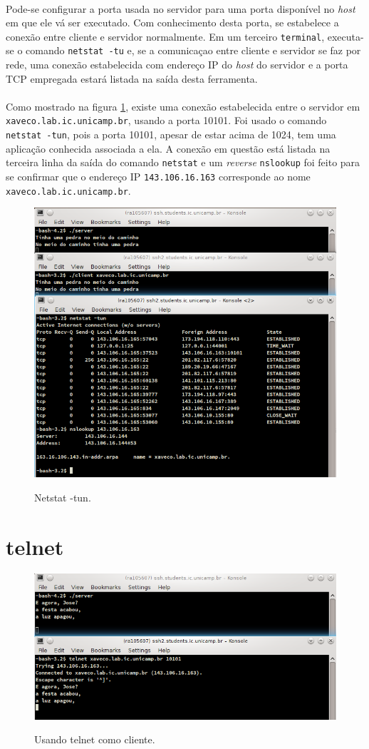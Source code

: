 \documentclass[a4paper,10pt,oneside,final,titlepage,onecolumn]{article}
\begin{document}
\paragraph{}Pode-se configurar a porta usada no servidor para uma porta disponível no \emph{host} em que ele vá ser executado. Com conhecimento desta porta, se estabelece a conexão entre cliente e servidor normalmente. Em um terceiro \verb|terminal|, executa-se o comando \verb|netstat -tu| e, se a comunicaçao entre cliente e servidor se faz por rede, uma conexão estabelecida com endereço IP do \emph{host} do servidor e a porta TCP empregada estará listada na saída desta ferramenta.
\paragraph{}Como mostrado na figura \ref{netstat}, existe uma conexão estabelecida entre o servidor em \verb|xaveco.lab.ic.unicamp.br|, usando a porta 10101. Foi usado o comando \verb|netstat -tun|, pois a porta 10101, apesar de estar acima de 1024, tem uma aplicação conhecida associada a ela. A conexão em questão está listada na terceira linha da saída do comando \verb|netstat| e um \emph{reverse} \verb|nslookup| foi feito para se confirmar que o endereço IP \verb|143.106.16.163| corresponde ao nome \verb|xaveco.lab.ic.unicamp.br|.
\begin{figure}[!ht]
  \caption{Netstat -tun.}
  \centering
  \includegraphics[width=117mm]{netstat.png}
  \label{netstat}
\end{figure}



\section{telnet}

\begin{figure}[!ht]
  \caption{Usando telnet como cliente.}
  \centering
  \includegraphics[width=117mm]{telnet.png}
  \label{telnet}
\end{figure}
\end{document}
